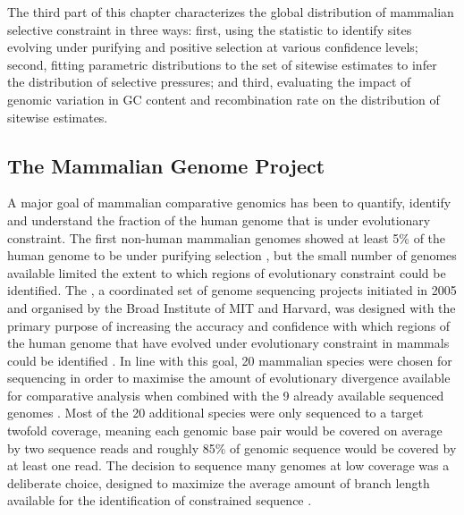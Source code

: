 The third part of this chapter characterizes the global distribution
of mammalian selective constraint in three ways: first, using the \slr
statistic to identify sites evolving under purifying and positive
selection at various confidence levels; second, fitting parametric
distributions to the set of sitewise estimates to infer the
distribution of selective pressures; and third, evaluating the impact
of genomic variation in GC content and recombination rate on the
distribution of sitewise estimates.

\subsection{The Mammalian Genome Project}

A major goal of mammalian comparative genomics has been to quantify,
identify and understand the fraction of the human genome that is under
evolutionary constraint. The first non-human mammalian genomes showed
at least 5\% of the human genome to be under purifying selection
\citep{Mouse2002Initial,Rat2004Genome,LindbladToh2005Genome}, but the
small number of genomes available limited the extent to which regions
of evolutionary constraint could be identified. The \mgp, a
coordinated set of genome sequencing projects initiated in 2005 and
organised by the Broad Institute of MIT and Harvard, was designed with
the primary purpose of increasing the accuracy and confidence with
which regions of the human genome that have evolved under evolutionary
constraint in mammals could be identified \citep{Margulies2007}. In
line with this goal, 20 mammalian species were chosen for sequencing
in order to maximise the amount of evolutionary divergence available
for comparative analysis when combined with the 9 already available
sequenced genomes \citep{Margulies2005Initial}. Most of the 20
additional species were only sequenced to a target twofold coverage,
meaning each genomic base pair would be covered on average by two
sequence reads and roughly 85\% of genomic sequence would be covered
by at least one read. The decision to sequence many genomes at low
coverage was a deliberate choice, designed to maximize the average
amount of branch length available for the identification of
constrained sequence \citep{Margulies2007}.

